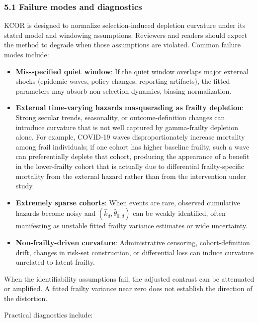 \documentclass[
]{article}
\providecommand{\tightlist}{%
  \setlength{\itemsep}{0pt}\setlength{\parskip}{0pt}}
\begin{document}
\subsubsection{5.1 Failure modes and diagnostics}\label{failure-modes-and-diagnostics}

KCOR is designed to normalize selection-induced depletion curvature under its stated model and windowing assumptions. Reviewers and readers should expect the method to degrade when those assumptions are violated. Common failure modes include:

\begin{itemize}
\tightlist
\item
  \textbf{Mis-specified quiet window}: If the quiet window overlaps major external shocks (epidemic waves, policy changes, reporting artifacts), the fitted parameters may absorb non-selection dynamics, biasing normalization.
\item
  \textbf{External time-varying hazards masquerading as frailty depletion}: Strong secular trends, seasonality, or outcome-definition changes can introduce curvature that is not well captured by gamma-frailty depletion alone. For example, COVID-19 waves disproportionately increase mortality among frail individuals; if one cohort has higher baseline frailty, such a wave can preferentially deplete that cohort, producing the appearance of a benefit in the lower-frailty cohort that is actually due to differential frailty-specific mortality from the external hazard rather than from the intervention under study.
\item
  \textbf{Extremely sparse cohorts}: When events are rare, observed cumulative hazards become noisy and \((\hat{k}_d,\hat{\theta}_{0,d})\) can be weakly identified, often manifesting as unstable fitted frailty variance estimates or wide uncertainty.
\item
  \textbf{Non-frailty-driven curvature}: Administrative censoring, cohort-definition drift, changes in risk-set construction, or differential loss can induce curvature unrelated to latent frailty.
\end{itemize}

When the identifiability assumptions fail, the adjusted contrast can be attenuated or amplified. A fitted frailty variance near zero does not establish the direction of the distortion.

Practical diagnostics include:
\end{document}
